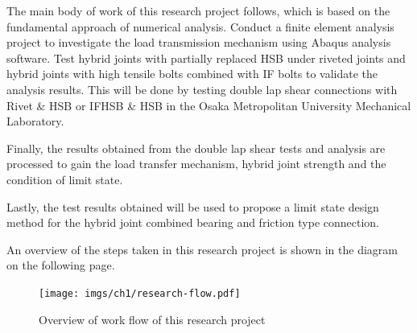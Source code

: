 The main body of work of this research project follows, which is based on the fundamental approach of numerical analysis. Conduct a finite element analysis project to investigate the load transmission mechanism using Abaqus analysis software. Test hybrid joints with partially replaced HSB under riveted joints and hybrid joints with high tensile bolts combined with IF bolts to validate the analysis results. This will be done by testing double lap shear connections with Rivet \& \ac{HSB} or \ac{IFHSB} \& HSB in the Osaka Metropolitan University Mechanical Laboratory.

Finally, the results obtained from the double lap shear tests and analysis are processed to gain the load transfer mechanism, hybrid joint strength and the condition of limit state.

Lastly, the test results obtained will be used to propose a limit state design method for the hybrid joint combined bearing and friction type connection.

An overview of the steps taken in this research project is shown in the diagram on the following page.

\begin{figure}
    \centering
    \texttt{[image: imgs/ch1/research-flow.pdf]}
    \caption{Overview of work flow of this research project}
    \label{fig-rflow}
\end{figure}